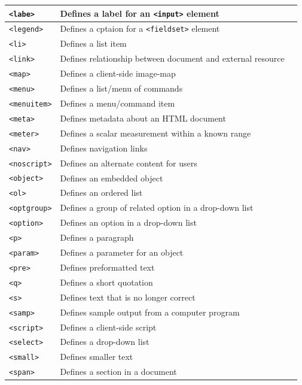 \documentclass[11pt, letterpaper]{article}
\begin{document}
\begin{longtable}{l p{10cm} l}
			\texttt{<labe>} & Defines a label for an \texttt{<input>} element\\\midrule
			\texttt{<legend>} & Defines a cptaion for a \texttt{<fieldset>} element\\\midrule
			\texttt{<li>} & Defines a list item\\\midrule
			\texttt{<link>} & Defines relationship between document and external resource\\\midrule
			\texttt{<map>} & Defines a client-side image-map\\\midrule
			\texttt{<menu>} & Defines a list/menu of commands\\\midrule
			\texttt{<menuitem>} & Defines a menu/command item\\\midrule
			\texttt{<meta>} & Defines metadata about an HTML document\\\midrule
			\texttt{<meter>} & Defines a scalar measurement within a known range\\\midrule
			\texttt{<nav>} & Defines navigation links\\\midrule
			\texttt{<noscript>} & Defines an alternate content for users\\\midrule
			\texttt{<object>} & Defines an embedded object\\\midrule
			\texttt{<ol>} & Defines an ordered list\\\midrule
			\texttt{<optgroup>} & Defines a group of related option in a drop-down list\\\midrule
			\texttt{<option>} & Defines an option in a drop-down list\\\midrule
			\texttt{<p>} & Defines a paragraph\\\midrule
			\texttt{<param>} & Defines a parameter for an object\\\midrule
			\texttt{<pre>} & Defines preformatted text\\\midrule
			\texttt{<q>} & Defines a short quotation\\\midrule
			\texttt{<s>} & Defines text that is no longer correct\\\midrule
			\texttt{<samp>} & Defines sample output from a computer program\\\midrule
			\texttt{<script>} & Defines a client-side script\\\midrule
			\texttt{<select>} & Defines a drop-down list\\\midrule
			\texttt{<small>} & Defines smaller text\\\midrule
			\texttt{<span>} & Defines a section in a document\\\midrule

\end{longtable}
\end{document}
